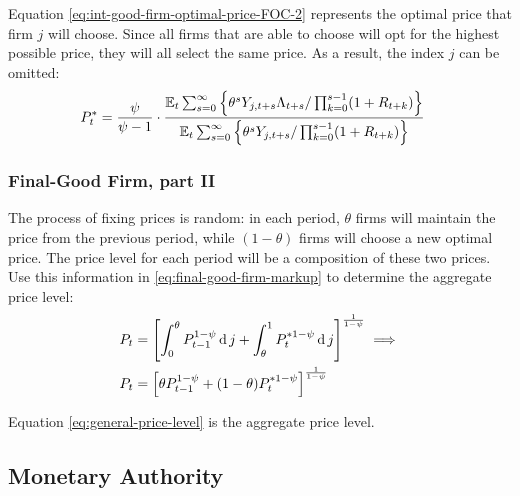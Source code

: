 \documentclass[
	thesis.tex
	]{subfiles}
\begin{document}

Equation \ref{eq:int-good-firm-optimal-price-FOC-2} represents the optimal price that firm $j$ will choose. Since all firms that are able to choose will opt for the highest possible price, they will all select the same price. As a result, the index $j$ can be omitted:
\begin{align}
	\label{eq:int-good-firm-optimal-price-FOC-3}
	P_t^\ast &= 
	\frac{\psi}{\psi-1} \cdot
	\frac{
		{\mathbb{E}_{t}} \sum_{s=0}^{\infty} \left\{ 
		\theta^s Y_{j,t+s} \Lambda_{t+s} / \prod_{k=0}^{s-1}(1+R_{t+k}) \right\} } {{\mathbb{E}_{t}} \sum_{s=0}^{\infty} \left\{
		\theta^s Y_{j,t+s} / \prod_{k=0}^{s-1}(1+R_{t+k}) \right\}}
\end{align}


\subsubsection{Final-Good Firm, part II}

The process of fixing prices is random: in each period, $\theta$ firms will maintain the price from the previous period, while $(1-\theta)$ firms will choose a new optimal price. The price level for each period will be a composition of these two prices. Use this information in \ref{eq:final-good-firm-markup} to determine the aggregate price level:
\begin{align}
	P_t & = \left[ \int_{0}^{\theta} P_{t-1}^{1-\psi} \operatorname{d} j + \int_{\theta}^{1} P_t^{\ast 1-\psi} \operatorname{d} j \right]^{\frac{1}{1-\psi}}  \implies \nonumber \\
	P_t & = \left[ \theta P_{t-1}^{1-\psi} + (1-\theta) P_t^{\ast 1-\psi} \right]^\frac{1}{1-\psi} \label{eq:general-price-level}
\end{align}

Equation \ref{eq:general-price-level} is the aggregate price level.


\subsection{Monetary Authority}
\end{document}
